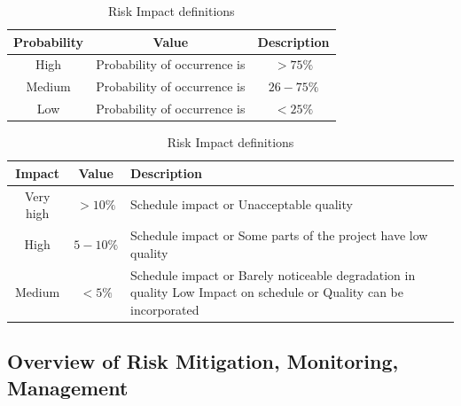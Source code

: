 \documentclass[oneside,a4paper,12pt]{report}
\begin{document}
\begin{table}[!htbp]
\begin{table}[!htbp]
\begin{center}
\def\arraystretch{1.5}
\begin{tabular}{| c | c | c |}
\hline
Probability & Value &	Description \\ \hline
High &	Probability of occurrence is &  $ > 75 \% $ \\ \hline
Medium &	Probability of occurrence is  & $26-75 \% $ \\ \hline
Low	& Probability of occurrence is & $ < 25 \% $ \\ \hline
\end{tabular}
\end{center}
\caption{Risk Probability definitions \cite{bookPressman}}
\label{tab:riskdef}
\end{table}

\begin{table}[!htbp]
\begin{center}
\def\arraystretch{1.5}
\begin{tabularx}{\textwidth}{| c | c | X |}
\hline
Impact & Value	& Description \\ \hline
Very high &	$> 10 \%$ & Schedule impact or Unacceptable quality \\ \hline
High &	$5-10 \%$ & Schedule impact or Some parts of the project have low quality \\ \hline
Medium	& $ < 5 \% $ & Schedule impact or Barely noticeable degradation in quality Low	Impact on schedule or Quality can be incorporated \\ \hline
\end{tabularx}
\end{center}
\caption{Risk Impact definitions \cite{bookPressman}}
\label{tab:riskImpactDef}
\end{table}

\subsection{Overview of Risk Mitigation, Monitoring, Management}



\end{table}
\end{document}
